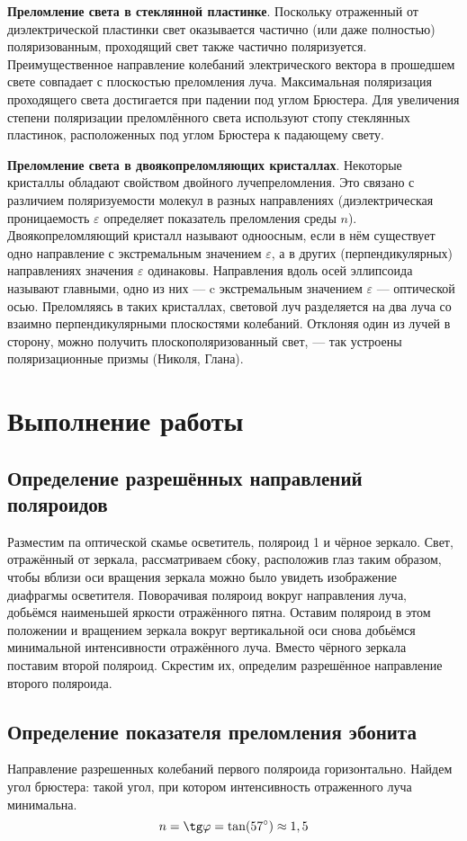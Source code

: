 \documentclass[a4paper, 12pt]{article}
\begin{document}
	\textbf{Преломление света в стеклянной пластинке}. Поскольку отраженный от
	диэлектрической пластинки свет оказывается частично (или даже полностью) поляризованным, проходящий свет также частично поляризуется. Преимущественное направление колебаний электрического вектора
	в прошедшем свете совпадает с плоскостью преломления луча. Максимальная поляризация проходящего света достигается при падении под
	углом Брюстера. Для увеличения степени поляризации преломлённого
	света используют стопу стеклянных пластинок, расположенных под углом Брюстера к падающему свету.
	
	\textbf{Преломление света в двоякопреломляющих кристаллах}. Некоторые кристаллы обладают свойством двойного лучепреломления. Это связано с различием поляризуемости молекул в разных направлениях (диэлектрическая проницаемость $\varepsilon$ определяет показатель преломления среды $n$).
	Двоякопреломляющий кристалл называют одноосным, если в нём существует одно направление с экстремальным значением $\varepsilon$, а в других (перпендикулярных) направлениях значения $\varepsilon$ одинаковы. Направления вдоль осей эллипсоида называют главными, одно из них --- c экстремальным значением $\varepsilon$ --- оптической осью. Преломляясь в таких кристаллах, световой луч разделяется на два луча со взаимно перпендикулярными плоскостями колебаний. Отклоняя	один из лучей в сторону, можно получить плоскополяризованный свет, --- так устроены поляризационные призмы (Николя, Глана).

\section{Выполнение работы}
\subsection{Определение разрешённых направлений поляроидов}
Разместим па оптической скамье осветитель, поляроид 1 и чёрное зеркало. Свет, отражённый от зеркала, рассматриваем сбоку, расположив глаз таким образом, чтобы вблизи оси вращения зеркала можно было увидеть изображение диафрагмы осветителя. Поворачивая поляроид вокруг направления луча, добьёмся наименьшей яркости отражённого пятна. Оставим поляроид в этом положении и вращением зеркала вокруг вертикальной оси снова добьёмся минимальной интенсивности отражённого луча.
Вместо чёрного зеркала поставим второй поляроид. Скрестим их, определим разрешённое направление второго поляроида.

\subsection{Определение показателя преломления эбонита}
Направление разрешенных колебаний первого поляроида горизонтально. Найдем угол брюстера: такой угол, при котором интенсивность отраженного луча минимальна.
\begin{equation}
	n = \tg \varphi = \tan (57^\circ) \approx 1,5
\end{equation}
\end{document}
